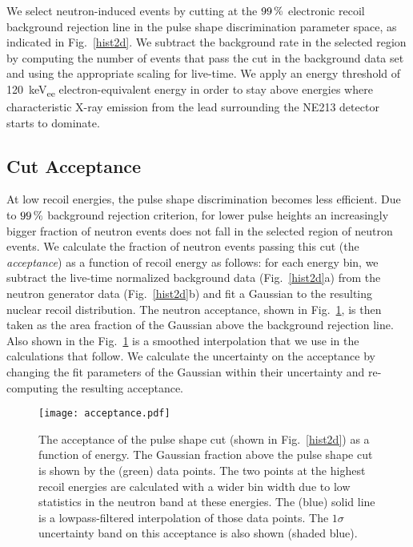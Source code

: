 We select neutron-induced events by cutting at the $99\, \mathrm{\%}$ electronic recoil background rejection line in the pulse shape discrimination parameter space, as indicated in Fig.~\ref{hist2d}. We subtract the background rate in the selected region by computing the number of events that pass the cut in the background data set and using the appropriate scaling for live-time.
We apply an energy threshold of \SI{120}{keV_{ee}} electron-equivalent energy in order to stay above energies where characteristic X-ray emission from the lead surrounding the NE213 detector starts to dominate.

\subsection{Cut Acceptance}

At low recoil energies, the pulse shape discrimination becomes less efficient. Due to $99\, \mathrm{\%}$ background rejection criterion, for lower pulse heights an increasingly bigger fraction of neutron events does not fall in the selected region of neutron events. We calculate the fraction of neutron events passing this cut (the \emph{acceptance}) as a function of recoil energy as follows: for each energy bin, we subtract the live-time normalized background data (Fig.~\ref{hist2d}a) from the neutron generator data (Fig.~\ref{hist2d}b) and fit a Gaussian to the resulting nuclear recoil distribution. The neutron acceptance, shown in Fig.~\ref{acceptance}, is then taken as the area fraction of the Gaussian above the background rejection line. Also shown in the Fig.~\ref{acceptance} is a smoothed interpolation that we use in the calculations that follow. We calculate the uncertainty on the acceptance by changing the fit parameters of the Gaussian within their uncertainty and re-computing the resulting acceptance.

\begin{figure}[!htbp]
\begin{center}
\texttt{[image: acceptance.pdf]}
\caption{The acceptance of the pulse shape cut (shown in Fig.~\ref{hist2d}) as a function of energy. The Gaussian fraction above the pulse shape cut is shown by the (green) data points. The two points at the highest recoil energies are calculated with a wider bin width due to low statistics in the neutron band at these energies. The (blue) solid line is a lowpass-filtered interpolation of those data points. The $1\sigma$ uncertainty band on this acceptance is also shown (shaded blue).}
\label{acceptance}
\end{center}
\end{figure}

